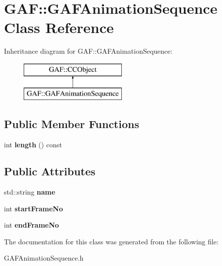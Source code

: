 \hypertarget{class_g_a_f_1_1_g_a_f_animation_sequence}{\section{G\-A\-F\-:\-:G\-A\-F\-Animation\-Sequence Class Reference}
\label{class_g_a_f_1_1_g_a_f_animation_sequence}
}
Inheritance diagram for G\-A\-F\-:\-:G\-A\-F\-Animation\-Sequence\-:\begin{figure}[H]
\begin{center}
\leavevmode
\includegraphics[height=2.000000cm]{class_g_a_f_1_1_g_a_f_animation_sequence}
\end{center}
\end{figure}
\subsection*{Public Member Functions}
\begin{DoxyCompactItemize}
\item 
\hypertarget{class_g_a_f_1_1_g_a_f_animation_sequence_a9cde0aeefe0013f12746f424139ed5be}{int {\bfseries length} () const }\label{class_g_a_f_1_1_g_a_f_animation_sequence_a9cde0aeefe0013f12746f424139ed5be}

\end{DoxyCompactItemize}
\subsection*{Public Attributes}
\begin{DoxyCompactItemize}
\item 
\hypertarget{class_g_a_f_1_1_g_a_f_animation_sequence_a7589a1bf527f6ff96c41b5722af7d9ab}{std\-::string {\bfseries name}}\label{class_g_a_f_1_1_g_a_f_animation_sequence_a7589a1bf527f6ff96c41b5722af7d9ab}

\item 
\hypertarget{class_g_a_f_1_1_g_a_f_animation_sequence_a5cd0c1aeb0565a2b839dedbd5a603a50}{int {\bfseries start\-Frame\-No}}\label{class_g_a_f_1_1_g_a_f_animation_sequence_a5cd0c1aeb0565a2b839dedbd5a603a50}

\item 
\hypertarget{class_g_a_f_1_1_g_a_f_animation_sequence_a936b4cf7ba81d69ab2e6c798558d434e}{int {\bfseries end\-Frame\-No}}\label{class_g_a_f_1_1_g_a_f_animation_sequence_a936b4cf7ba81d69ab2e6c798558d434e}

\end{DoxyCompactItemize}


The documentation for this class was generated from the following file\-:\begin{DoxyCompactItemize}
\item 
G\-A\-F\-Animation\-Sequence.\-h\end{DoxyCompactItemize}
